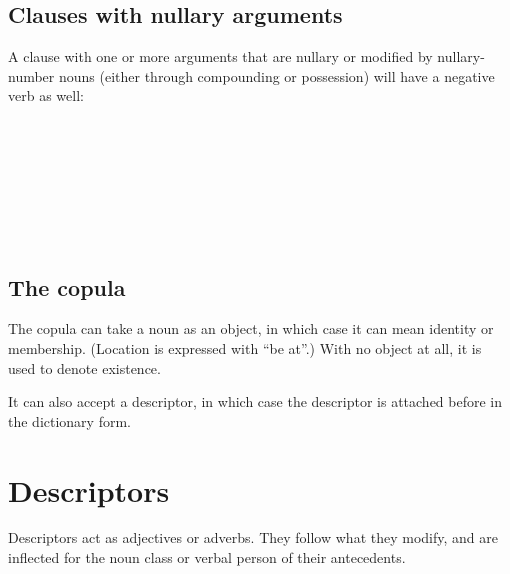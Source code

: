 \documentclass{book}
\begin{document}
\section{Clauses with nullary arguments}

A clause with one or more arguments that are nullary or modified by nullary-number nouns (either through compounding or possession) will have a negative verb as well: \\
~\\
 \\
  \\
  \\
~\\
 \\
     \\
    

\section{The copula}

The copula  can take a noun as an object, in which case it can mean identity or membership. (Location is expressed with  ``be at''.) With no object at all, it is used to denote existence.

It can also accept a descriptor, in which case the descriptor is attached before  in the dictionary form.

\chapter{Descriptors}

Descriptors act as adjectives or adverbs. They follow what they modify, and are inflected for the noun class or verbal person of their antecedents.
\end{document}
